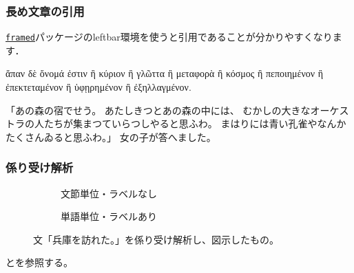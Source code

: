 \documentclass[
    12pt,
    unicode]{beamer}
\newenvironment{quoteblock}{%
    \def\FrameCommand{%
        {\color{sLightGray}{\vrule width 3pt}}%
        \hspace{10pt}
    }%
    \MakeFramed {\advance\hsize-\width \FrameRestore}}%
{\endMakeFramed}
\begin{document}
\begin{frame}
    \frametitle{長め文章の引用}
    \href{https://ctan.org/pkg/framed}{\texttt{framed}}パッケージのleftbar環境を使うと引用であることが分かりやすくなります．

    \begin{quoteblock}
ἅπαν δὲ ὄνομά ἐστιν ἢ κύριον ἢ γλῶττα ἢ μεταφορὰ ἢ κόσμος ἢ πεποιημένον ἢ ἐπεκτεταμένον ἢ ὑφῃρημένον ἢ ἐξηλλαγμένον.

\hfill {}
    \end{quoteblock}

    \begin{quoteblock}
        「あの森の宿でせう。
        あたしきつとあの森の中には、
        むかしの大きなオーケストラの人たちが集まつていらつしやると思ふわ。
        まはりには青い孔雀やなんかたくさんゐると思ふわ。」
        女の子が答へました。

        \hfill {}
    \end{quoteblock}
\end{frame}

\begin{frame}
    \frametitle{係り受け解析}
    \begin{figure}
        \begin{subfigure}[t]{0.38\textwidth}
            \centering
            \caption{文節単位・ラベルなし}
        \end{subfigure}
        \begin{subfigure}[t]{0.6\textwidth}
            \centering
            \caption{単語単位・ラベルあり}
        \end{subfigure}
        \caption{文「兵庫を訪れた。」を係り受け解析し、図示したもの。}
    \end{figure}
    とを参照する。
\end{frame}
\end{document}
